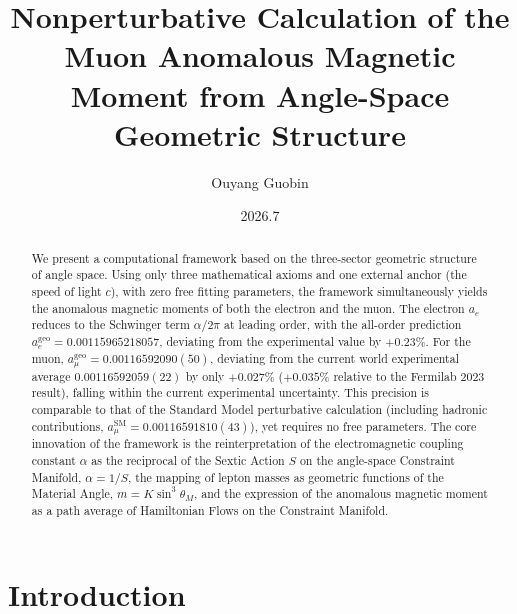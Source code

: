 \documentclass[aps,prd,reprint,nofootinbib]{revtex4-2}
\begin{document}
\title{Nonperturbative Calculation of the Muon Anomalous Magnetic Moment from Angle-Space Geometric Structure}

\author{Ouyang Guobin}

\date{2026.7}

\begin{abstract}
We present a computational framework based on the three-sector geometric structure of angle space. Using only three mathematical axioms and one external anchor (the speed of light $c$), with zero free fitting parameters, the framework simultaneously yields the anomalous magnetic moments of both the electron and the muon. The electron $a_e$ reduces to the Schwinger term $\alpha/2\pi$ at leading order, with the all-order prediction $a_e^{\text{geo}} = 0.00115965218057$, deviating from the experimental value by $+0.23\%$. For the muon, $a_\mu^{\text{geo}} = 0.00116592090(50)$, deviating from the current world experimental average $0.00116592059(22)$ by only $+0.027\%$ ($+0.035\%$ relative to the Fermilab 2023 result), falling within the current experimental uncertainty. This precision is comparable to that of the Standard Model perturbative calculation (including hadronic contributions, $a_\mu^{\text{SM}} = 0.00116591810(43)$), yet requires no free parameters. The core innovation of the framework is the reinterpretation of the electromagnetic coupling constant $\alpha$ as the reciprocal of the Sextic Action $S$ on the angle-space Constraint Manifold, $\alpha = 1/S$, the mapping of lepton masses as geometric functions of the Material Angle, $m = K\sin^3\theta_M$, and the expression of the anomalous magnetic moment as a path average of Hamiltonian Flows on the Constraint Manifold.
\end{abstract}


\maketitle

\section{Introduction}
\end{document}
